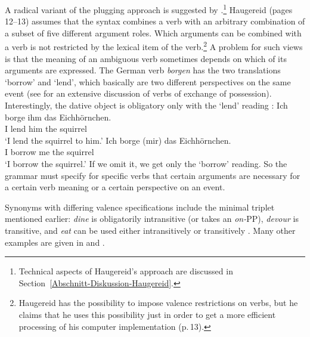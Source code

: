 \begin{exe}
\begin{xlist}[iv.]
\begin{exe}
\begin{xlist}[iv.]
A radical variant of the plugging approach is suggested by \citet{Haugereid2009a}.\footnote{%
  Technical aspects of Haugereid's approach are discussed in Section~\ref{Abschnitt-Diskussion-Haugereid}.
} Haugereid
(pages\,12--13) assumes that the syntax combines a verb with an arbitrary combination of a subset of
five different argument roles. Which arguments can be combined with a verb is not restricted by the
lexical item of the verb.\footnote{%
  Haugereid has the possibility to impose valence restrictions on verbs, but he claims that he uses
  this possibility just in order to get a more efficient processing of his computer implementation (p.\,13).
}
A problem for such views is that the meaning of an ambiguous verb sometimes depends on which of its
arguments are expressed.  The German verb \emph{borgen} has the two translations `borrow' and
`lend', which basically are two different perspectives on the same event (see
 for an extensive discussion of verbs of exchange of possession).
Interestingly, the dative object is obligatory only with the `lend' reading \citep[]{MuellerGTBuch1}: 
\eal
\ex 
\gll Ich borge ihm das Eichhörnchen.\\
     I   lend  him the squirrel\\
\glt `I lend the squirrel to him.'
\ex 
\gll Ich borge (mir) das Eichhörnchen.\\
     I borrow me the squirrel\\
\glt `I borrow the squirrel.'
\zl
If we omit it, we get only the `borrow' reading. 
So the grammar must specify for specific verbs that certain arguments are
necessary for a certain verb meaning or a certain perspective on an event.

Synonyms with differing valence specifications include the minimal triplet mentioned earlier: \emph{dine} is obligatorily intransitive (or takes an \emph{on-}PP), \emph{devour} is transitive, and \emph{eat} can be used either intransitively or transitively \citep[--90]{Dowty89b-u}.  Many other examples are given in  \citet{Levin93a-u} and \citet{LRH2005a-u}.
%



\end{xlist}
\end{exe}
\end{xlist}
\end{exe}
